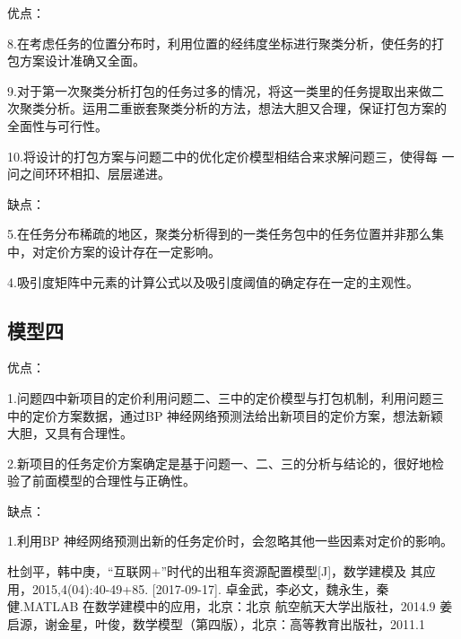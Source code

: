 \documentclass[withoutpreface,bwprint]{cumcmthesis} %
\begin{document}
优点：

8.在考虑任务的位置分布时，利用位置的经纬度坐标进行聚类分析，使任务的打
包方案设计准确又全面。

9.对于第一次聚类分析打包的任务过多的情况，将这一类里的任务提取出来做二
次聚类分析。运用二重嵌套聚类分析的方法，想法大胆又合理，保证打包方案的
全面性与可行性。

10.将设计的打包方案与问题二中的优化定价模型相结合来求解问题三，使得每
一问之间环环相扣、层层递进。

缺点：

5.在任务分布稀疏的地区，聚类分析得到的一类任务包中的任务位置并非那么集
中，对定价方案的设计存在一定影响。

4.吸引度矩阵中元素的计算公式以及吸引度阈值的确定存在一定的主观性。

\subsection{模型四}

优点：

1.问题四中新项目的定价利用问题二、三中的定价模型与打包机制，利用问题三
中的定价方案数据，通过BP 神经网络预测法给出新项目的定价方案，想法新颖
大胆，又具有合理性。

2.新项目的任务定价方案确定是基于问题一、二、三的分析与结论的，很好地检
验了前面模型的合理性与正确性。

缺点：

1.利用BP 神经网络预测出新的任务定价时，会忽略其他一些因素对定价的影响。

\begin{thebibliography}{9}%
杜剑平，韩中庚，“互联网+”时代的出租车资源配置模型[J]，数学建模及
    其应用，2015,4(04):40-49+85. [2017-09-17].
    卓金武，李必文，魏永生，秦健.MATLAB 在数学建模中的应用，北京：北京
    航空航天大学出版社，2014.9
    姜启源，谢金星，叶俊，数学模型（第四版），北京：高等教育出版社，2011.1
\end{thebibliography}

\begin{appendices}
\end{appendices}
\end{document}
